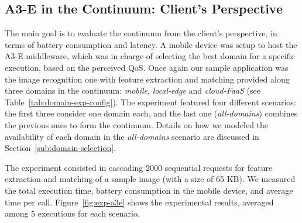 \subsection{A3-E in the Continuum: Client's Perspective} 
\label{sub:exp-a3e-continuum}

The main goal is to evaluate the continuum from the client's perspective, in terms of battery consumption and latency. A mobile device was setup to host the A3-E middleware, which was in charge of selecting the best domain for a specific execution, based on the perceived QoS. 
Once again our sample application was the image recognition one with feature extraction and matching provided along three domains in the continuum: \textit{mobile}, \textit{local-edge} and \textit{cloud-FaaS} (see Table~\ref{tab:domain-exp-config}). The experiment featured four different scenarios: the first three consider one domain each, and the last one (\textit{all-domains}) combines the previous ones to form the continuum. Details on how we modeled the availability of each domain in the \textit{all-domains} scenario are discussed in Section~\ref{sub:domain-selection}.

The experiment consisted in cascading $2000$ sequential requests for feature extraction and matching of a sample image (with a size of 65 KB). We measured the total execution time, battery consumption in the mobile device, and average time per call. Figure~\ref{fig:exp-a3e} shows the experimental results, averaged among $5$ executions for each scenario.


